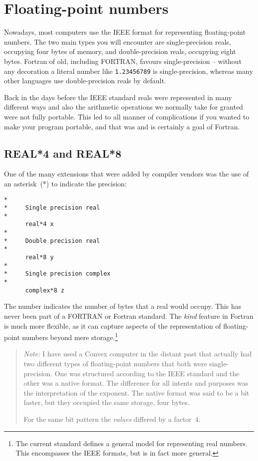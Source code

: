 \section{Floating-point numbers}
Nowadays, most computers use the IEEE format for representing floating-point numbers.
The two main types you will encounter are single-precision reals, occupying four
bytes of memory, and double-precision reals, occupying eight bytes. Fortran of old,
including FORTRAN, favours single-precision -- without any decoration a literal
number like \verb+1.23456789+ is single-precision, whereas many other languages
use double-precision reals by default.

Back in the days before the IEEE standard reals \cite{IEEE} were represented in many different ways
and also the arithmetic operations we normally take for granted were not fully portable.
This led to all manner of complications if you wanted to make your program portable, and
that was and is certainly a goal of Fortran.

\subsection{REAL*4 and REAL*8}
One of the many extensions that were added by compiler vendors was the use of an asterisk~(*)
to indicate the precision:
\begin{verbatim}
*
*     Single precision real
*
      real*4 x
*
*     Double precision real
*
      real*8 y
*
*     Single precision complex
*
      complex*8 z
\end{verbatim}
The number indicates the number of bytes that a real would occupy. This has never been
part of a FORTRAN or Fortran standard. The \emph{kind} feature in Fortran is much more
flexible, as it can capture aspects of the representation of floating-point numbers
beyond mere storage.\footnote{The current standard defines a general model for representing
real numbers. This encompasses the IEEE formats, but is in fact more general.}

\begin{quote}
\emph{Note:} I have used a Convex computer in the distant past that actually had two
different types of floating-point numbers that both were single-precision. One was
structured according to the IEEE standard and the other was a native format. The difference
for all intents and purposes was the interpretation of the exponent. The native format
was said to be a bit faster, but they occupied the same storage, four bytes.

For the same bit pattern the \emph{values} differed by a factor~4.
\end{quote}

